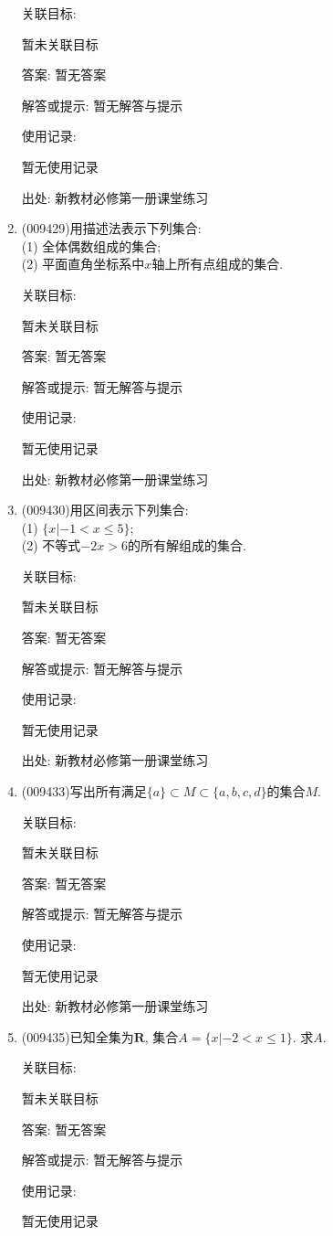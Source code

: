 \documentclass[10pt,a4paper]{article}
\begin{document}
\begin{enumerate}[1.]
关联目标:

暂未关联目标

答案: 暂无答案

解答或提示: 暂无解答与提示

使用记录:

暂无使用记录


出处: 新教材必修第一册课堂练习
\item { (009429)}用描述法表示下列集合:\\
(1) 全体偶数组成的集合;\\
(2) 平面直角坐标系中$x$轴上所有点组成的集合.


关联目标:

暂未关联目标

答案: 暂无答案

解答或提示: 暂无解答与提示

使用记录:

暂无使用记录


出处: 新教材必修第一册课堂练习
\item { (009430)}用区间表示下列集合:\\
(1) $\{x|-1<x\le 5\}$;\\
(2) 不等式$-2x>6$的所有解组成的集合.


关联目标:

暂未关联目标

答案: 暂无答案

解答或提示: 暂无解答与提示

使用记录:

暂无使用记录


出处: 新教材必修第一册课堂练习
\item { (009433)}写出所有满足$\{a\}\subset M\subset \{a, b, c, d\}$的集合$M$.


关联目标:

暂未关联目标

答案: 暂无答案

解答或提示: 暂无解答与提示

使用记录:

暂无使用记录


出处: 新教材必修第一册课堂练习
\item { (009435)}已知全集为$\mathbf{R}$, 集合$A=\{x|-2<x\le 1\}$. 求$A$.


关联目标:

暂未关联目标

答案: 暂无答案

解答或提示: 暂无解答与提示

使用记录:

暂无使用记录



\end{enumerate}
\end{document}
